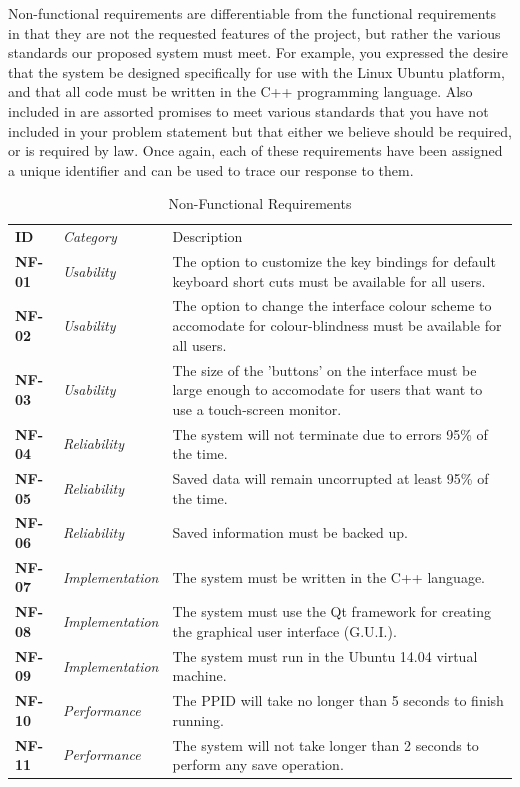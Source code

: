 \documentclass[12pt,letterpaper]{article}
\begin{document}
Non-functional requirements are differentiable from the functional requirements in that they are not the requested features of the project, but
rather the various standards our proposed system must meet. For example, you expressed the desire that the system be designed specifically 
for use with the Linux Ubuntu platform, and that all code must be written in the C++ programming language. Also included in  are
assorted promises to meet various standards that you have not included in your problem statement but that either we believe should be required, 
or is required by law. Once again, each of these requirements have been assigned a unique identifier and can be used to trace our response to them.

\begin{table}[H]
	\caption{Non-Functional Requirements}
	\begin{tabu} to 
	    \tableheader{}ID & Category & Description\\
		NF-01 & Usability & The option to customize the key bindings for default keyboard short cuts must be available for all users.\\
		NF-02 & Usability & The option to change the interface colour scheme to accomodate for colour-blindness must be available for all users.\\
		NF-03 & Usability & The size of the 'buttons' on the interface must be large enough to accomodate for users that want to use a touch-screen monitor.\\
		NF-04 & Reliability & The system will not terminate due to errors 95\% of the time.\\
		NF-05 & Reliability & Saved data will remain uncorrupted at least 95\% of the time. \\
		NF-06 & Reliability & Saved information must be backed up. \\
		NF-07 & Implementation & The system must be written in the C++ language. \\
		NF-08 & Implementation & The system must use the Qt framework for creating the graphical user interface (G.U.I.). \\
		NF-09 & Implementation & The system must run in the Ubuntu 14.04 virtual machine. \\
		NF-10 & Performance & The PPID will take no longer than 5 seconds to finish running. \\
		NF-11 & Performance & The system will not take longer than 2 seconds to perform any save operation. \\

\end{tabu}
\end{table}
\end{document}
